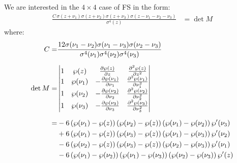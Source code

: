 \documentclass[11pt,a4paper]{article}
\begin{document}
We are interested in the $4\times4$ case of FS in the form:
\begin{align}
\label{eq:fs-det-m}
\frac{C\,\sigma{\left(z + {\nu}_{1}\right)} \sigma{\left(z + {\nu}_{2}\right)} \sigma{\left(z + {\nu}_{3}\right)} \sigma{\left(z - {\nu}_{1} - {\nu}_{2} - {\nu}_{3}\right)}}{\sigma^{4}{\left(z\right)}} & = \det M
\end{align}
where:
\begin{align}
C = &\frac{12  \sigma{\left({\nu}_{1} - {\nu}_{2}\right)} \sigma{\left({\nu}_{1} - {\nu}_{3}\right)} \sigma{\left({\nu}_{2} - {\nu}_{3}\right)} }{\sigma^{4}{\left({\nu}_{1}\right)} \sigma^{4}{\left({\nu}_{2}\right)} \sigma^{4}{\left({\nu}_{3}\right)}} \\[6pt]
\det M = &
\begin{vmatrix}
1 & \wp(z) & \frac{\partial \wp(z)}{\partial z} & \frac{\partial^2 \wp(z)}{\partial z^2} \\
1 & \wp(\nu_1) & -\frac{\partial \wp(\nu_1)}{\partial \nu_1} & \frac{\partial^2 \wp(\nu_1)}{\partial \nu_1^2} \\
1 & \wp(\nu_2) & -\frac{\partial \wp(\nu_2)}{\partial \nu_2} & \frac{\partial^2 \wp(\nu_2)}{\partial \nu_2^2} \\
1 & \wp(\nu_3) & -\frac{\partial \wp(\nu_3)}{\partial \nu_3} & \frac{\partial^2 \wp(\nu_3)}{\partial \nu_3^2} \\
\end{vmatrix}  \notag \\[6pt]
= & - 6 \left(\wp{\left({\nu}_{1}\right)} - \wp{\left(z\right)}\right) \left(\wp{\left({\nu}_{2}\right)} - \wp{\left(z\right)}\right) \left(\wp{\left({\nu}_{1}\right)} - \wp{\left({\nu}_{2}\right)}\right) \wp'{\left({\nu}_{3}\right)} \notag \\
& + 6 \left(\wp{\left({\nu}_{1}\right)} - \wp{\left(z\right)}\right) \left(\wp{\left({\nu}_{3}\right)} - \wp{\left(z\right)}\right) \left(\wp{\left({\nu}_{1}\right)} - \wp{\left({\nu}_{3}\right)}\right) \wp'{\left({\nu}_{2}\right)}  \notag \\
& - 6 \left(\wp{\left({\nu}_{2}\right)} - \wp{\left(z\right)}\right) \left(\wp{\left({\nu}_{3}\right)} - \wp{\left(z\right)}\right) \left(\wp{\left({\nu}_{2}\right)} - \wp{\left({\nu}_{3}\right)}\right) \wp'{\left({\nu}_{1}\right)}  \notag \\
& - 6 \left(\wp{\left({\nu}_{1}\right)} - \wp{\left({\nu}_{2}\right)}\right) \left(\wp{\left({\nu}_{1}\right)} - \wp{\left({\nu}_{3}\right)}\right) \left(\wp{\left({\nu}_{2}\right)} - \wp{\left({\nu}_{3}\right)}\right) \wp'{\left(z\right)}
\end{align}
\end{document}

